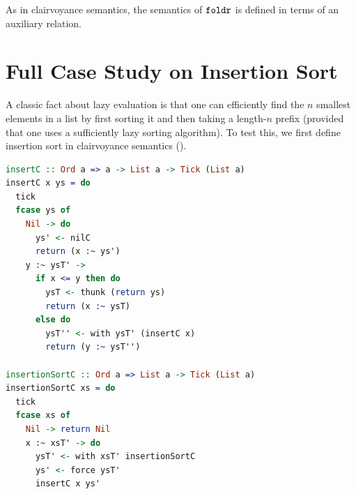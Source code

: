 \begin{center}
  \begin{prooftree}
  \end{prooftree}
\end{center}

As in clairvoyance semantics, the semantics of \( \texttt{foldr} \) is defined in terms of an auxiliary relation.

\begin{center}
  \begin{prooftree}
  \end{prooftree}
\end{center}

\begin{center}
  \begin{prooftree}
  \end{prooftree}
\end{center}

\begin{center}
  \begin{prooftree}
  \end{prooftree}
\end{center}
\fi

\section{Full Case Study on Insertion Sort}\label{apx:case-study-insertion-sort}

A classic fact about lazy evaluation is that one can efficiently find the \(n\)
smallest elements in a list by first sorting it and then taking a length-\(n\)
prefix (provided that one uses a sufficiently lazy sorting algorithm). To test
this, we first define insertion sort in clairvoyance semantics
().

\begin{lstlisting}[language=Curry]
insertC :: Ord a => a -> List a -> Tick (List a)
insertC x ys = do
  tick
  fcase ys of
    Nil -> do
      ys' <- nilC
      return (x :~ ys')
    y :~ ysT' ->
      if x <= y then do
        ysT <- thunk (return ys)
        return (x :~ ysT)
      else do
        ysT'' <- with ysT' (insertC x)
        return (y :~ ysT'')

insertionSortC :: Ord a => List a -> Tick (List a)
insertionSortC xs = do
  tick
  fcase xs of
    Nil -> return Nil
    x :~ xsT' -> do
      ysT' <- with xsT' insertionSortC
      ys' <- force ysT'
      insertC x ys'
\end{lstlisting}

